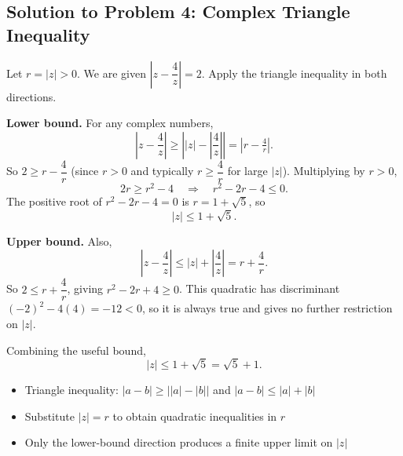 \subsection{Solution to Problem 4: Complex Triangle Inequality}

\begin{solution}
Let $r = |z| > 0$. We are given $\left|z - \dfrac{4}{z}\right| = 2$. Apply the triangle inequality in both directions.

\textbf{Lower bound.} For any complex numbers,
\[
\left|z - \frac{4}{z}\right| \ge \left||z| - \left|\frac{4}{z}\right|\right| = |r - \tfrac{4}{r}|.
\]
So $2 \ge r - \dfrac{4}{r}$ (since $r > 0$ and typically $r \ge \dfrac{4}{r}$ for large $|z|$). Multiplying by $r > 0$,
\[
2r \ge r^2 - 4
\quad\Longrightarrow\quad
r^2 - 2r - 4 \le 0.
\]
The positive root of $r^2 - 2r - 4 = 0$ is $r = 1 + \sqrt{5}$, so
\[
|z| \le 1 + \sqrt{5}.
\]

\textbf{Upper bound.} Also,
\[
\left|z - \frac{4}{z}\right| \le |z| + \left|\frac{4}{z}\right| = r + \frac{4}{r}.
\]
So $2 \le r + \dfrac{4}{r}$, giving $r^2 - 2r + 4 \ge 0$. This quadratic has discriminant $(-2)^2 - 4(4) = -12 < 0$, so it is always true and gives no further restriction on $|z|$.

Combining the useful bound,
\[
|z| \le 1 + \sqrt{5} = \sqrt{5} + 1.
\]
\end{solution}

\begin{takeaways}
\begin{itemize}
    \item Triangle inequality: $|a-b| \ge \bigl||a|-|b|\bigr|$ and $|a-b| \le |a|+|b|$
    \item Substitute $|z|=r$ to obtain quadratic inequalities in $r$
    \item Only the lower-bound direction produces a finite upper limit on $|z|$
\end{itemize}
\end{takeaways}
